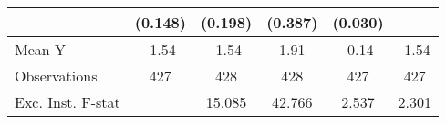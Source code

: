 {\begin{tabular}{l*{5}{c}}
            &     (0.148)         &     (0.198)         &     (0.387)         &     (0.030)         &                     \\
\midrule
Mean Y      &       -1.54         &       -1.54         &        1.91         &       -0.14         &       -1.54         \\
Observations&         427         &         428         &         428         &         427         &         427         \\
Exc. Inst. F-stat&                     &      15.085         &      42.766         &       2.537         &       2.301         \\
\bottomrule
\end{tabular}
}
